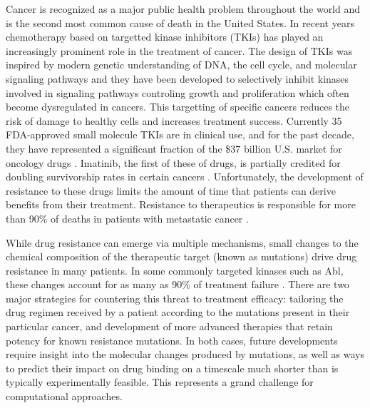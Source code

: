Cancer is recognized as a major public health problem throughout the world and is the second most common cause of death in the United States. \cite{Siegel2016}
In recent years chemotherapy based on targetted kinase inhibitors (TKIs) has played an increasingly prominent role in the treatment of cancer.
The design of TKIs was inspired by modern genetic understanding of DNA, the cell cycle, and molecular signaling pathways and they have been developed to selectively inhibit kinases involved in signaling pathways 
controling growth and proliferation which often become dysregulated in cancers.
This targetting of specific cancers reduces the risk of damage to healthy cells and increases treatment success.
Currently 35 FDA-approved small molecule TKIs are in clinical use, and for the past decade, they have represented a significant fraction of the \$37 billion U.S. market for oncology drugs \cite{FDA, Zhao2014}.
Imatinib, the first of these of drugs, is partially credited for doubling survivorship rates in certain cancers \cite{Zhao2014, ACSreport}.
Unfortunately, the development of resistance to these drugs limits the amount of time that patients can derive benefits from their treatment. 
Resistance to therapeutics is responsible for more than 90\% of deaths in patients with metastatic cancer \cite{Longley2005}.

While drug resistance can emerge via multiple mechanisms, small changes to the chemical composition of the therapeutic target (known as mutations) drive drug resistance in many patients.
In some commonly targeted kinases such as Abl, these changes account for as many as 90\% of treatment failure \cite{Shah2002}.
There are two major strategies for countering this threat to treatment efficacy: tailoring the drug regimen received by a patient according to the mutations present in their particular cancer, and development of more advanced %
therapies that retain potency for known resistance mutations.
In both cases, future developments require insight into the molecular changes produced by mutations, as well as ways to predict their impact on drug binding on a timescale much shorter than is typically experimentally feasible.
This represents a grand challenge for computational approaches.

